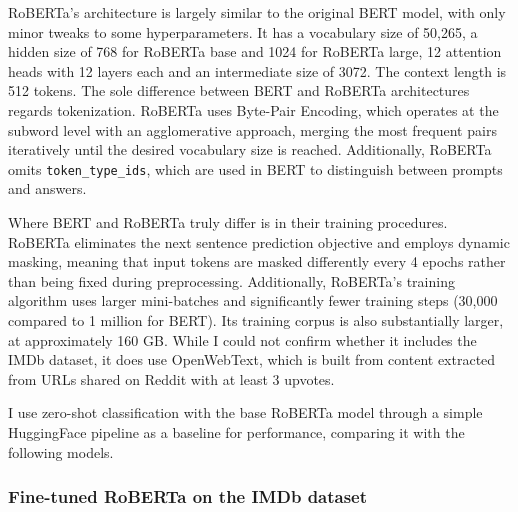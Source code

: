 \documentclass{article}
\begin{document}
RoBERTa's architecture is largely similar to the original BERT model, with only minor tweaks to some hyperparameters. It has a vocabulary size of 50,265, a hidden size of 768 for RoBERTa base and 1024 for RoBERTa large, 12 attention heads with 12 layers each and an intermediate size of 3072. The context length is 512 tokens. The sole difference between BERT and RoBERTa architectures regards tokenization. RoBERTa uses Byte-Pair Encoding, which operates at the subword level with an agglomerative approach, merging the most frequent pairs iteratively until the desired vocabulary size is reached. Additionally, RoBERTa omits \texttt{token\_type\_ids}, which are used in BERT to distinguish between prompts and answers.

Where BERT and RoBERTa truly differ is in their training procedures. RoBERTa eliminates the next sentence prediction objective and employs dynamic masking, meaning that input tokens are masked differently every 4 epochs rather than being fixed during preprocessing. Additionally, RoBERTa's training algorithm uses larger mini-batches and significantly fewer training steps (30,000 compared to 1 million for BERT). Its training corpus is also substantially larger, at approximately 160 GB. While I could not confirm whether it includes the IMDb dataset, it does use OpenWebText, which is built from content extracted from URLs shared on Reddit with at least 3 upvotes.

I use zero-shot classification with the base RoBERTa model through a simple HuggingFace pipeline as a baseline for performance, comparing it with the following models.

\subsubsection{Fine-tuned RoBERTa on the IMDb dataset}
\end{document}
